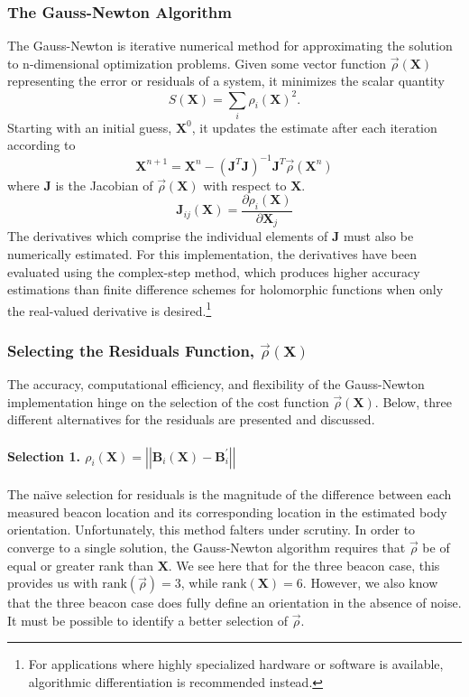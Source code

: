 \documentclass{report}
\begin{document}
				\subsubsection{The Gauss-Newton Algorithm}
					The Gauss-Newton is iterative numerical method for approximating the solution to n-dimensional optimization problems.\cite{numMethods} Given some vector function $\vec{\rho}(\mathbf{X})$ representing the error or residuals of a system, it minimizes the scalar quantity
					\begin{equation}
						S(\mathbf{X})=\sum_{i}\rho_i\left(\mathbf{X}\right)^2.
					\end{equation}
					Starting with an initial guess, $\mathbf{X}^0$, it updates the estimate after each iteration according to
					\begin{equation}
						\mathbf{X}^{n+1}=\mathbf{X}^n-\left(\mathbf{J}^{T}\mathbf{J}\right)^{-1}\mathbf{J}^{T}\vec{\rho}\left(\mathbf{X}^n\right)
					\end{equation}
					where $\mathbf{J}$ is the Jacobian of $\vec\rho\left(\mathbf{X}\right)$ with respect to $\mathbf{X}$.
					\begin{equation}
						\mathbf{J}_{ij}\left(\mathbf{X}\right)=\frac{\partial\rho_i\left(\mathbf{X}\right)}{\partial\mathbf{X}_j}
					\end{equation}
					The derivatives which comprise the individual elements of $\mathbf{J}$ must also be numerically estimated. For this implementation, the derivatives have been evaluated using the complex-step method, which produces higher accuracy estimations than finite difference schemes for holomorphic functions when only the real-valued derivative is desired.\cite{numMethods}\footnote{For applications where highly specialized hardware or software is available, algorithmic differentiation is recommended instead.}
				\subsubsection{Selecting the Residuals Function, $\vec\rho\left(\mathbf{X}\right)$}
					The accuracy, computational efficiency, and flexibility of the Gauss-Newton implementation hinge on the selection of the cost function $\vec\rho\left(\mathbf{X}\right)$. Below, three different alternatives for the residuals are presented and discussed.
					\paragraph{Selection 1. $\rho_i(\mathbf{X})=\left|\left|\mathbf{B}_i\left(\mathbf{X}\right)-{\mathbf{B}^\prime_i}\right|\right|$}
					The na{\"\i}ve selection for residuals is the magnitude of the difference between each measured beacon location and its corresponding location in the estimated body orientation. Unfortunately, this method falters under scrutiny. In order to converge to a single solution, the Gauss-Newton algorithm requires that $\vec\rho$ be of equal or greater rank than $\mathbf{X}$. We see here that for the three beacon case, this provides us with $\text{rank}\left(\vec\rho\right)=3$, while $\text{rank}\left(\mathbf{X}\right)=6$. However, we also know that the three beacon case does fully define an orientation in the absence of noise. It must be possible to identify a better selection of $\vec\rho$.
\end{document}
